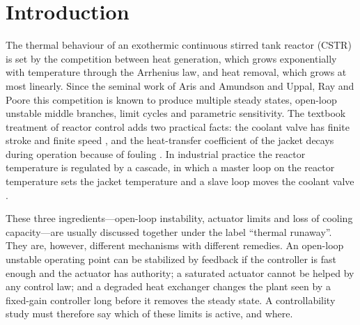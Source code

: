 \section{Introduction}
\label{sec:introduction}

The thermal behaviour of an exothermic continuous stirred tank reactor (CSTR) is set by the competition between heat generation, which grows exponentially with temperature through the Arrhenius law, and heat removal, which grows at most linearly. Since the seminal work of Aris and Amundson \cite{aris1958analysis} and Uppal, Ray and Poore \cite{uppal1974dynamic} this competition is known to produce multiple steady states, open-loop unstable middle branches, limit cycles and parametric sensitivity. The textbook treatment of reactor control \cite{seborg2010process,bequette2003process,luyben2007chemical,ogata2010modern} adds two practical facts: the coolant valve has finite stroke and finite speed \cite{hippe2006windup,tarbouriech2009antiwindup,bohn1995analysis,peng1996nonlinear}, and the heat-transfer coefficient of the jacket decays during operation because of fouling \cite{bott1995fouling,epstein1983thinking,macchietto2011fouling,coletti2010impact}. In industrial practice the reactor temperature is regulated by a cascade, in which a master loop on the reactor temperature sets the jacket temperature and a slave loop moves the coolant valve \cite{shinskey1996process,seborg2010process,astrom2006pid,visioli2006practical}.

These three ingredients---open-loop instability, actuator limits and loss of cooling capacity---are usually discussed together under the label ``thermal runaway''. They are, however, different mechanisms with different remedies. An open-loop unstable operating point can be stabilized by feedback if the controller is fast enough and the actuator has authority; a saturated actuator cannot be helped by any control law; and a degraded heat exchanger changes the plant seen by a fixed-gain controller long before it removes the steady state. A controllability study must therefore say which of these limits is active, and where.

